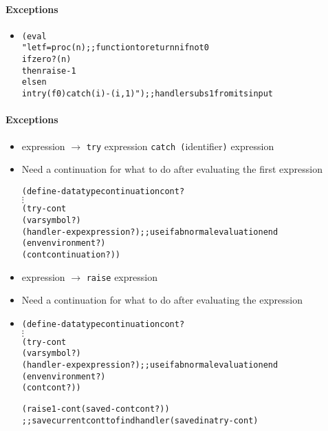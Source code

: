 \documentclass{beamer}
\newcommand{\vdotss}{\(\vdots\)}
\begin{document}
\begin{frame}[fragile]
\framesubtitle{Exceptions}
\begin{scriptsize}
\begin{itemize}
\item<1-> 
\begin{alltt}
(eval 
 "let f = proc (n)     ;; function to return n if not 0
           if zero?(n)
           then raise -1
           else n
  in try (f 0) catch (i) -(i, 1)") ;; handler subs 1 from its input
\end{alltt}

\end{itemize}
\end{scriptsize}
\end{frame}

\begin{frame}[fragile]
\framesubtitle{Exceptions}
\begin{scriptsize}
\begin{itemize}
\item<1-> expression $\rightarrow$ \texttt{try} expression \texttt{catch (}identifier\texttt{)} expression

\item<1-> Need a continuation for what to do after evaluating the first expression
\begin{alltt}
(define-datatype continuation cont?
     \vdotss{}
  (try-cont
    (var symbol?)
    (handler-exp expression?) ;; use if abnormal evaluation end
    (env environment?)
    (cont continuation?))
\end{alltt}

\item<2-> expression $\rightarrow$ \texttt{raise} expression

\item<2-> Need a continuation for what to do after evaluating the expression

\item<2->
\begin{alltt}
(define-datatype continuation cont?
     \vdotss{}
  (try-cont
    (var symbol?)
    (handler-exp expression?) ;; use if abnormal evaluation end
    (env environment?)
    (cont cont?))

  (raise1-cont (saved-cont cont?)) 
  ;; save current cont to find handler (saved in a try-cont)
\end{alltt}

\end{itemize}
\end{scriptsize}
\end{frame}
\end{document}

